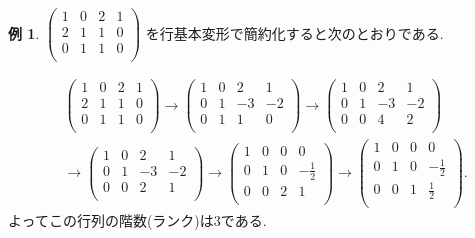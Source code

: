 \documentclass[dvipdfmx,a4paper,11pt]{article} %
\newcommand{\maru}[1]{\raise0.2ex\hbox{\textcircled{\tiny{#1}}}}
\theoremstyle{definition}
\newtheorem{exa}[thm]{例}
\begin{document}
\begin{exa}
$
 \begin{pmatrix}
 1& 0& 2  &1\\
 2& 1& 1  &0\\
 0& 1& 1  &0\\
 \end{pmatrix}
 $
 を行基本変形で簡約化すると次のとおりである.
 
 \begin{align*}
 &\begin{pmatrix}
 1& 0& 2  &1\\
 2& 1& 1  &0\\
 0& 1& 1  &0\\
 \end{pmatrix}
\longrightarrow  %
\begin{pmatrix}
 1& 0& 2  &1\\
 0& 1& -3 &-2\\
 0& 1& 1  &0\\
 \end{pmatrix}
\longrightarrow  %
\begin{pmatrix}
 1& 0& 2  &1\\
 0& 1& -3 &-2\\
 0& 0& 4  &2\\
 \end{pmatrix}
 \\ %
 & \longrightarrow 
\begin{pmatrix}
 1& 0& 2  &1\\
 0& 1& -3 &-2\\
 0& 0& 2  &1\\
 \end{pmatrix} 
 \longrightarrow %
 \begin{pmatrix}
 1& 0& 0  &0\\
 0& 1& 0 &-\frac{1}{2}\\
 0& 0& 2  &1\\
 \end{pmatrix} 
 \longrightarrow %
  \begin{pmatrix}
 1& 0& 0  &0\\
 0& 1& 0 &-\frac{1}{2}\\
 0& 0& 1 &\frac{1}{2}\\
 \end{pmatrix}.
 \end{align*}
   よってこの行列の階数(ランク)は3である.
 \end{exa}
 
\end{document}

